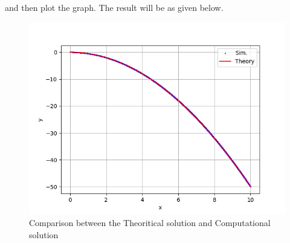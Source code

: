 \documentclass[journal]{IEEEtran}
\begin{document}
and then plot the graph. The result will be as given below.
\begin{figure}[h!]
   \centering
   \includegraphics[width=\columnwidth]{figs/fig.png}
   \caption{Comparison between the Theoritical solution and Computational solution}
   \label{stemplot}
\end{figure}
\end{document}
